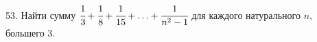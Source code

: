 53. Найти сумму $\cfrac{1}{3}+\cfrac{1}{8}+\cfrac{1}{15}+\ldots+\cfrac{1}{n^2-1}$ для каждого натурального $n,$ большего 3.\\
